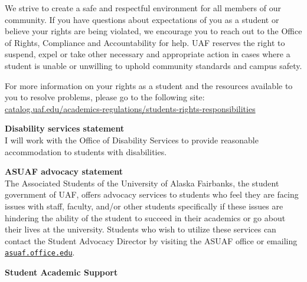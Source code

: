 \documentclass[12pt]{article}
\renewcommand{\emph}[1]{\textsf{\textbf{#1}}}
\newcommand{\localhead}[1]{\par\smallskip\textbf{#1} \smallskip\nobreak\\}%
\def\subheading#1{\localhead{\emph{#1}}}
\begin{document}
We strive to create a safe and respectful environment for all members of our community. If you have questions about expectations of you as a student or believe your rights are being violated, we encourage you to reach out to the  Office of Rights, Compliance and Accountability for help. UAF reserves the right to suspend, expel or take other necessary and appropriate action in cases where a student is unable or unwilling to uphold community standards and campus safety.

For more information on your rights as a student and the resources available to you to resolve problems, please go to the following site: \href{https://catalog.uaf.edu/academics-regulations/students-rights-responsibilities/}{catalog.uaf.edu/academics-regulations/students-rights-responsibilities}

\subheading{Disability services statement} I will work with the Office of Disability Services to provide reasonable accommodation to students with disabilities.

\subheading{ASUAF advocacy statement} The Associated Students of the University of Alaska Fairbanks, the student government of UAF, offers advocacy services to students who feel they are facing issues with staff, faculty, and/or other students specifically if these issues are hindering the ability of the student to succeed in their academics or go about their lives at the university. Students who wish to utilize these services can contact the Student Advocacy Director by visiting the ASUAF office or emailing \href{mailto:asuaf.office@alaska.edu}{\texttt{asuaf.office\@@alaska.edu}}.


\subheading{Student Academic Support}
\end{document}
